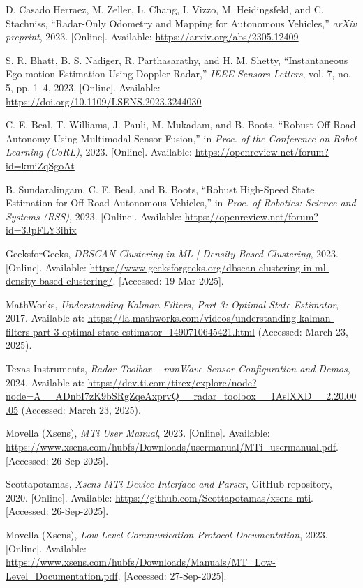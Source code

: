 \begin{thebibliography}{00}
D. Casado Herraez, M. Zeller, L. Chang, I. Vizzo, M. Heidingsfeld, and C. Stachniss, 
``Radar-Only Odometry and Mapping for Autonomous Vehicles,'' 
\textit{arXiv preprint}, 2023. [Online]. Available: \url{https://arxiv.org/abs/2305.12409}

S. R. Bhatt, B. S. Nadiger, R. Parthasarathy, and H. M. Shetty, 
``Instantaneous Ego-motion Estimation Using Doppler Radar,'' 
\textit{IEEE Sensors Letters}, vol. 7, no. 5, pp. 1–4, 2023. [Online]. Available: \url{https://doi.org/10.1109/LSENS.2023.3244030}

C. E. Beal, T. Williams, J. Pauli, M. Mukadam, and B. Boots, 
``Robust Off-Road Autonomy Using Multimodal Sensor Fusion,'' 
in \textit{Proc. of the Conference on Robot Learning (CoRL)}, 2023. [Online]. Available: \url{https://openreview.net/forum?id=kmiZqSgoAt}

B. Sundaralingam, C. E. Beal, and B. Boots, 
``Robust High-Speed State Estimation for Off-Road Autonomous Vehicles,'' 
in \textit{Proc. of Robotics: Science and Systems (RSS)}, 2023. [Online]. Available: \url{https://openreview.net/forum?id=3JpFLY3ihix}


GeeksforGeeks, 
\emph{DBSCAN Clustering in ML | Density Based Clustering}, 
2023. [Online]. Available: \url{https://www.geeksforgeeks.org/dbscan-clustering-in-ml-density-based-clustering/}. [Accessed: 19-Mar-2025].

MathWorks,
\textit{Understanding Kalman Filters, Part 3: Optimal State Estimator},
2017. Available at: \url{https://la.mathworks.com/videos/understanding-kalman-filters-part-3-optimal-state-estimator--1490710645421.html} (Accessed: March 23, 2025).

Texas Instruments, 
\textit{Radar Toolbox – mmWave Sensor Configuration and Demos}, 
2024. Available at: \url{https://dev.ti.com/tirex/explore/node?node=A__ADnbI7zK9bSRgZqeAxprvQ__radar_toolbox__1AslXXD__2.20.00.05} (Accessed: March 23, 2025).

Movella (Xsens),  
\textit{MTi User Manual},  
2023. [Online]. Available: \url{https://www.xsens.com/hubfs/Downloads/usermanual/MTi_usermanual.pdf}. [Accessed: 26-Sep-2025].  

Scottapotamas,  
\textit{Xsens MTi Device Interface and Parser},  
GitHub repository, 2020. [Online]. Available: \url{https://github.com/Scottapotamas/xsens-mti}. [Accessed: 26-Sep-2025].  

Movella (Xsens),  
\textit{Low-Level Communication Protocol Documentation},  
2023. [Online]. Available: \url{https://www.xsens.com/hubfs/Downloads/Manuals/MT_Low-Level_Documentation.pdf}. [Accessed: 27-Sep-2025].  


\end{thebibliography}